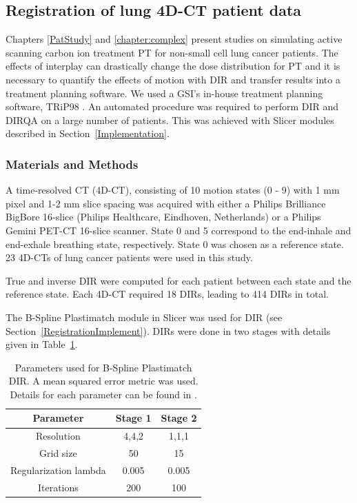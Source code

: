 \documentclass[type=dr, dr=rernat, accentcolor=tud7b,colorbacktitle, bigchapter, openright, twoside, 12pt ]{tudthesis}
\begin{document}
\subsection{Registration of lung 4D-CT patient data}
\label{lungDIR}

Chapters \ref{PatStudy} and \ref{chapter:complex} present studies on simulating active scanning carbon ion treatment PT for non-small cell lung cancer patients. 
The effects of interplay can drastically change the dose distribution for PT and it is necessary to quantify the effects of motion with DIR and transfer results into a treatment 
planning software. We used a GSI's in-house treatment planning software, TRiP98 \cite{Kraemer2000a, Richter2013}. An automated procedure was required to perform DIR and DIRQA on a large number of patients. This was achieved with Slicer modules described in Section~\ref{Implementation}.

\subsubsection{Materials and Methods}

A time-resolved CT (4D-CT), consisting of 10 motion states (0 - 9) with 1 mm pixel and 1-2 mm slice spacing was acquired with either a Philips Brilliance BigBore 16-slice 
(Philips Healthcare, Eindhoven, Netherlands) or a Philips Gemini PET-CT 16-slice scanner. 
State 0 and 5 correspond to the end-inhale and end-exhale breathing state, respectively. State 0 was chosen as a reference state. 23 4D-CTs of lung cancer patients were used in this study.

True and inverse DIR were computed for each patient between each state and the reference state. Each 4D-CT required 18 DIRs, leading to 414 DIRs in total.

The B-Spline Plastimatch module in Slicer was used for DIR (see Section~\ref{RegistrationImplement}). DIRs were done in two stages with details given in Table~\ref{tab:stages}. 

\begin{table}[H]
  \centering
  \caption{Parameters used for B-Spline Plastimatch DIR. A mean squared error metric was used. Details for each parameter can be found in \cite{Plastimatch}.}
  \begin{tabular}{c|c|c}
      Parameter & Stage 1 & Stage 2 \\
      \hline
      Resolution & 4,4,2 & 1,1,1 \\
      Grid size & 50 & 15 \\
      Regularization lambda & 0.005 & 0.005 \\
      Iterations & 200 & 100 \\
    \hline\hline
  \end{tabular}
  \label{tab:stages}
\end{table}
\end{document}
